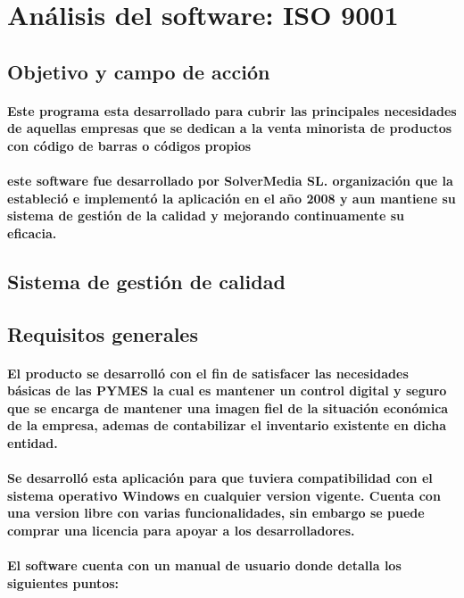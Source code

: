 \documentclass[12pt,a4paper]{ articule }
\begin{document}
\section{Análisis del software: ISO 9001}
\subsection{Objetivo y campo de acción}
\paragraph{Este programa esta desarrollado para cubrir las principales necesidades de aquellas empresas que se dedican a la venta minorista de productos con código de barras o códigos propios}
\paragraph{este software fue desarrollado por SolverMedia SL. organización que la estableció e implementó la aplicación en el año 2008 y aun mantiene su sistema de gestión de la calidad y mejorando continuamente su eficacia.}

\subsection{Sistema de gestión de calidad}
\subsection*{Requisitos generales}
\paragraph{El producto se desarrolló con el fin de satisfacer las necesidades básicas de las PYMES la cual es mantener un control digital y seguro que se encarga de mantener una imagen fiel de la situación económica de la empresa, ademas de contabilizar el inventario existente en dicha entidad.}
\paragraph{Se desarrolló esta aplicación para que tuviera compatibilidad con el sistema operativo Windows en cualquier version vigente. Cuenta con una version libre con varias funcionalidades, sin embargo se puede comprar una licencia para apoyar a los desarrolladores.}
\paragraph{El software cuenta con un manual de usuario donde detalla los siguientes puntos:}
\end{document}
